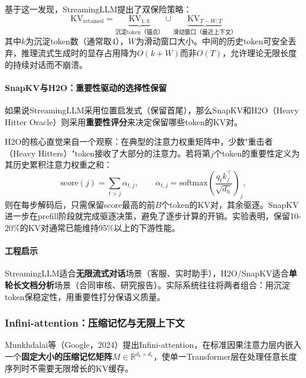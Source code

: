 \documentclass[12pt,a4paper]{article}
\begin{document}
基于这一发现，StreamingLLM提出了双保险策略：
\begin{equation}
\text{KV}_{\text{retained}} = \underbrace{\text{KV}_{1:k}}_{\text{沉淀token（锚点）}} \cup \underbrace{\text{KV}_{T-W:T}}_{\text{滑动窗口（最近上下文）}}
\end{equation}
其中$k$为沉淀token数（通常取4），$W$为滑动窗口大小。中间的历史token可安全丢弃，推理流式生成时的显存占用降为$O(k + W)$而非$O(T)$，允许理论无限长度的持续对话而不崩溃。

\paragraph{SnapKV与H2O：重要性驱动的选择性保留}

如果说StreamingLLM采用位置启发式（保留首尾），那么SnapKV和H2O（Heavy Hitter Oracle）则采用\textbf{重要性评分}来决定保留哪些token的KV对。

H2O的核心直觉来自一个观察：在典型的注意力权重矩阵中，少数"重击者（Heavy Hitters）"token接收了大部分的注意力。若将第$j$个token的重要性定义为其历史累积注意力权重之和：
\begin{equation}
\text{score}(j) = \sum_{t>j} \alpha_{t,j}, \qquad \alpha_{t,j} = \text{softmax}\!\left(\frac{q_t k_j^\top}{\sqrt{d_h}}\right)_j,
\end{equation}
则在每步解码后，只需保留score最高的前$B$个token的KV对，其余驱逐。SnapKV进一步在prefill阶段就完成驱逐决策，避免了逐步计算的开销。实验表明，保留10-20\%的KV对通常已能维持95\%以上的下游性能。

\paragraph{工程启示}

StreamingLLM适合\textbf{无限流式对话}场景（客服、实时助手），H2O/SnapKV适合\textbf{单轮长文档分析}场景（合同审核、研究报告）。实际系统往往将两者组合：用沉淀token保稳定性，用重要性打分保语义质量。

\subsubsection{Infini-attention：压缩记忆与无限上下文}

Munkhdalai等（Google，2024）提出Infini-attention，在标准因果注意力层内嵌入一个\textbf{固定大小的压缩记忆矩阵}$M \in \mathbb{R}^{d_k \times d_v}$，使单一Transformer层在处理任意长度序列时不需要无限增长的KV缓存。
\end{document}
